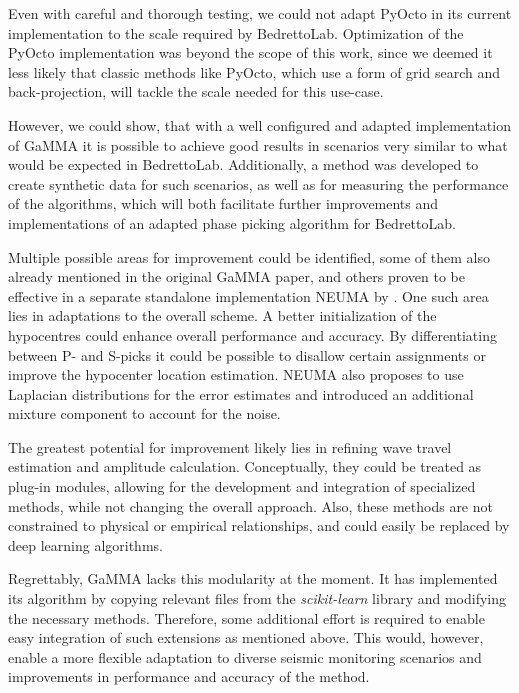 \documentclass{scrreprt}
\begin{document}
Even with careful and thorough testing, we could not adapt PyOcto in its current implementation to the scale required by BedrettoLab. Optimization of the PyOcto implementation was beyond the scope of this work, since we deemed it less likely that classic methods like PyOcto, which use a form of grid search and back-projection, will tackle the scale needed for this use-case.

However, we could show, that with a well configured and adapted implementation of GaMMA it is possible to achieve good results in scenarios very similar to what would be expected in BedrettoLab. Additionally, a method was developed to create synthetic data for such scenarios, as well as for measuring the performance of the algorithms, which will both facilitate further improvements and implementations of an adapted phase picking algorithm for BedrettoLab.

Multiple possible areas for improvement could be identified, some of them also already mentioned in the original GaMMA paper, and others proven to be effective in a separate standalone implementation NEUMA by \citet{neuma}. One such area lies in adaptations to the overall scheme. A better initialization of the hypocentres could enhance overall performance and accuracy. By differentiating between P- and S-picks it could be possible to disallow certain assignments or improve the hypocenter location estimation. NEUMA also proposes to use Laplacian distributions for the error estimates and introduced an additional mixture component to account for the noise.

The greatest potential for improvement likely lies in refining wave travel estimation and amplitude calculation. Conceptually, they could be treated as plug-in modules, allowing for the development and integration of specialized methods, while not changing the overall approach. Also, these methods are not constrained to physical or empirical relationships, and could easily be replaced by deep learning algorithms.

Regrettably, GaMMA lacks this modularity at the moment. It has implemented its algorithm by copying relevant files from the \textit{scikit-learn} library \citep{scikit-learn} and modifying the necessary methods. Therefore, some additional effort is required to enable easy integration of such extensions as mentioned above. This would, however, enable a more flexible adaptation to diverse seismic monitoring scenarios and improvements in performance and accuracy of the method.


\printbibliography
\end{document}
